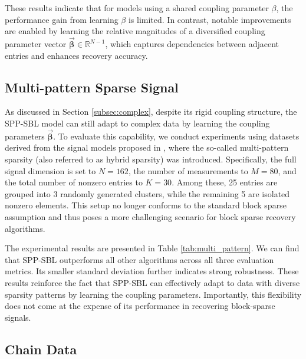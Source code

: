 \documentclass[lettersize,journal]{IEEEtran}
\theoremstyle{remark}
\begin{document}
These results indicate that for models using a shared coupling parameter $\beta$, the performance gain from learning $\beta$ is limited. In contrast, notable  improvements are enabled by learning the relative magnitudes of a diversified coupling parameter vector $\vec{\boldsymbol{\beta}} \in \mathbb{R}^{N-1}$, which captures dependencies between adjacent entries and enhances recovery accuracy.



\subsection{Multi-pattern Sparse Signal} \label{multi}


As discussed in Section \ref{subsec:complex}, despite its rigid coupling structure, the SPP-SBL model can still adapt to complex data by learning the coupling parameters $\vec{\boldsymbol{\beta}}$. To evaluate this capability, we conduct experiments using datasets derived from the signal models proposed in \cite{sant2021general, sant2022block}, where the so-called multi-pattern sparsity (also referred to as hybrid sparsity) was introduced. Specifically, the full signal dimension is set to \( N = 162 \), the number of measurements to \( M = 80 \), and the total number of nonzero entries to \( K = 30 \). Among these, 25 entries are grouped into 3 randomly generated clusters, while the remaining 5 are isolated nonzero elements. This setup no longer conforms to the standard block sparse assumption and thus poses a more challenging scenario for block sparse recovery algorithms.


The experimental results are presented in Table \ref{tab:multi_pattern}. We can find that SPP-SBL outperforms all other algorithms across all three evaluation metrics. Its smaller standard deviation further indicates strong robustness. These results reinforce the fact that SPP-SBL can effectively adapt to data with diverse sparsity patterns by learning the coupling parameters. Importantly, this flexibility does not come at the expense of its performance in recovering block-sparse signals.




\subsection{Chain Data} \label{chain}
\end{document}
